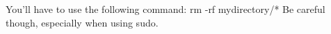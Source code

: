 You'll have to use the following command: rm -rf mydirectory/*
Be careful though, especially when using sudo.